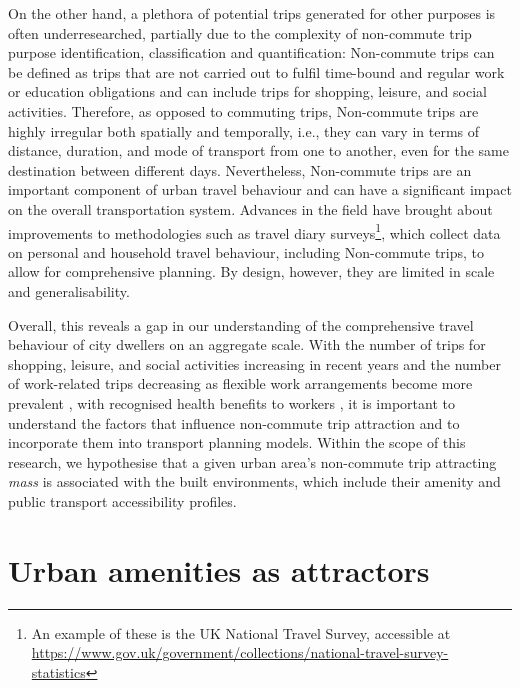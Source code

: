 On the other hand, a plethora of potential trips generated for other purposes is often underresearched, partially due to the complexity of non-commute trip purpose identification, classification and quantification: Non-commute trips can be defined as trips that are not carried out to fulfil time-bound and regular work or education obligations and can include trips for shopping, leisure, and social activities. Therefore, as opposed to commuting trips, Non-commute trips are highly irregular both spatially and temporally, i.e., they can vary in terms of distance, duration, and mode of transport from one to another, even for the same destination between different days. Nevertheless, Non-commute trips are an important component of urban travel behaviour and can have a significant impact on the overall transportation system. Advances in the field have brought about improvements to methodologies such as travel diary surveys\footnote{An example of these is the UK National Travel Survey, accessible at \url{https://www.gov.uk/government/collections/national-travel-survey-statistics}}, which collect data on personal and household travel behaviour, including Non-commute trips, to allow for comprehensive planning. By design, however, they are limited in scale and generalisability.

Overall, this reveals a gap in our understanding of the comprehensive travel behaviour of city dwellers on an aggregate scale. With the number of trips for shopping, leisure, and social activities increasing in recent years and the number of work-related trips decreasing as flexible work arrangements become more prevalent \citep{wohnerWorkFlexiblyTravel2022}, with recognised health benefits to workers \citep{macleodCommutingWorkPostpandemic2022}, it is important to understand the factors that influence non-commute trip attraction and to incorporate them into transport planning models. Within the scope of this research, we hypothesise that a given urban area's non-commute trip attracting \textit{mass} is associated with the built environments, which include their amenity and public transport accessibility profiles. 

\section{Urban amenities as attractors}

